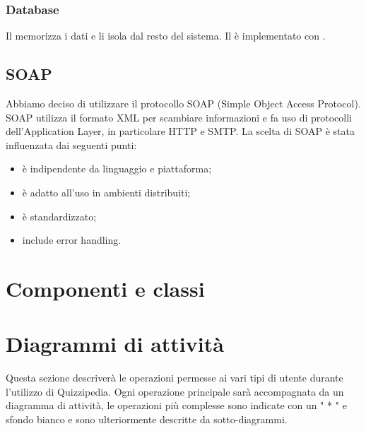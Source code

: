 \documentclass[a4paper, titlepage]{article}
\begin{document}
	\subsubsection{Database}
	Il  memorizza i dati e li isola dal resto del sistema. Il  è implementato con . 
	
	\subsection{SOAP}
	Abbiamo deciso di utilizzare il protocollo SOAP (Simple Object Access Protocol).
	SOAP utilizza il formato XML per scambiare informazioni e fa uso di protocolli dell'Application Layer, in particolare HTTP e SMTP.
	\newline La scelta di SOAP è stata influenzata dai seguenti punti:
	
	\begin{itemize}
		\item è indipendente da linguaggio e piattaforma;
		\item è adatto all'uso in ambienti distribuiti;
		\item è standardizzato;
		\item include error handling.
	\end{itemize}
	
\newpage

\section{Componenti e classi}


\newpage
\section{Diagrammi di attività}
Questa sezione descriverà le operazioni permesse ai vari tipi di utente durante l’utilizzo di Quizzipedia. Ogni operazione principale sarà accompagnata da un diagramma di attività, le operazioni più complesse sono indicate con un " * " e sfondo bianco e sono ulteriormente descritte da sotto-diagrammi.
\end{document}

